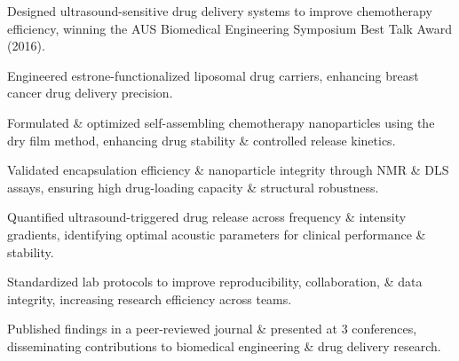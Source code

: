 \begin{tabitemize}
  \item Designed ultrasound-sensitive drug delivery systems to improve chemotherapy efficiency, winning the AUS Biomedical Engineering Symposium Best Talk Award (2016).
  \item Engineered estrone-functionalized liposomal drug carriers, enhancing breast cancer drug delivery precision.
  \item Formulated \& optimized self-assembling chemotherapy nanoparticles using the dry film method, enhancing drug stability \& controlled release kinetics.
  \item Validated encapsulation efficiency \& nanoparticle integrity through NMR \& DLS assays, ensuring high drug-loading capacity \& structural robustness.
  \item Quantified ultrasound-triggered drug release across frequency \& intensity gradients, identifying optimal acoustic parameters for clinical performance \& stability.
  \item Standardized lab protocols to improve reproducibility, collaboration, \& data integrity, increasing research efficiency across teams.
  \item Published findings in a peer-reviewed journal \& presented at 3 conferences, disseminating contributions to biomedical engineering \& drug delivery research.
\end{tabitemize}
\vspace{-1.5\baselineskip}
